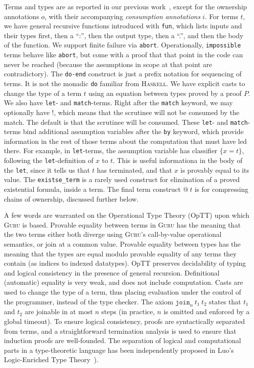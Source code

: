 \documentclass[9pt,natbib]{sigplanconf}
\begin{document}
Terms and types are as reported in our previous work~\cite{guru09},
except for the ownership annotations $o$, with their accompanying
\emph{consumption annotations} $i$.  For terms $t$, we have general
recursive functions introduced with \texttt{fun}, which lists inputs
and their types first, then a ``:'', then the output type, then a
``.'', and then the body of the function.  We support finite failure
via \texttt{abort}.  Operationally, \texttt{impossible} terms behave
like \texttt{abort}, but come with a proof that that point in the code
can never be reached (because the assumptions in scope at that point
are contradictory).  The \texttt{do-end} construct is just a prefix
notation for sequencing of terms.  It is not the monadic \texttt{do}
familiar from \textsc{Haskell}.  We have explicit casts to change the
type of a term $t$ using an equation between types proved by a proof
$P$.  We also have \texttt{let}- and \texttt{match}-terms.  Right
after the \texttt{match} keyword, we may optionally have $!$, which
means that the scrutinee will not be consumed by the match.  The
default is that the scrutinee will be consumed.  These \texttt{let}-
and \texttt{match}-terms bind additional assumption variables after
the \texttt{by} keyword, which provide information in the rest of
those terms about the computation that must have led there.  For
example, in \texttt{let}-terms, the assumption variable has classifier
$\{ x = t \}$, following the \texttt{let}-definition of $x$ to $t$.
This is useful informationa in the body of the \texttt{let}, since it
tells us that $t$ has terminated, and that $x$ is provably equal to
its value.  The \texttt{existse\_term} is a rarely used construct for
elimination of a proved existential formula, inside a term.  The final
term construct $@\ t$ is for compressing chains of ownership,
discussed further below.

A few words are warranted on the Operational Type Theory (OpTT) upon
which \textsc{Guru} is based.  Provable equality between terms in
\textsc{Guru} has the meaning that the two terms either both diverge
using \textsc{Guru}'s call-by-value operational semantics, or join at
a common value.  Provable equality between types has the meaning that
the types are equal modulo provable equality of any terms they contain
(as indices to indexed datatypes).  OpTT preserves decidability of
typing and logical consistency in the presence of general recursion.
Definitional (automatic) equality is very weak, and does not include
computation.  Casts are used to change the type of a term, thus
placing evaluation under the control of the programmer, instead of the
type checker.  The axiom $\texttt{join}_n\ t_1\ t_2$ states that $t_1$
and $t_2$ are joinable in at most $n$ steps (in practice, $n$ is
omitted and enforced by a global timeout).  To ensure logical
consistency, proofs are syntactically separated from terms, and a
straightforward termination analysis is used to ensure that induction
proofs are well-founded.  The separation of logical and computational
parts in a type-theoretic language has been independently proposed in
Luo's Logic-Enriched Type Theory~\cite{luo08}).
\end{document}
